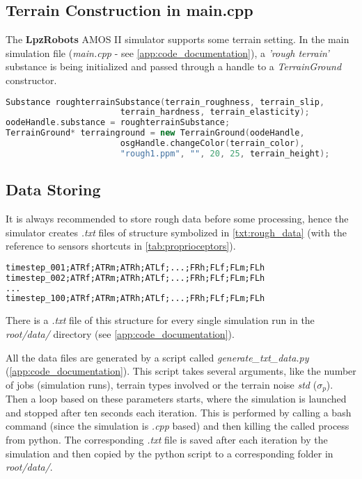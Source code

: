 \subsection*{Terrain Construction in main.cpp} \label{ssec:app:terrain_construction_in_main.cpp}
The \textbf{LpzRobots} AMOS II simulator supports some terrain setting. In the main simulation file (\textit{main.cpp} - see \ref{app:code_documentation}), a \textit{'rough terrain'} substance is being initialized and passed through a handle to a \textit{TerrainGround} constructor.

\begin{lstlisting}[language=C++, caption={Setting a terrain ground in main.cpp}, label=code:terrain_ground]
Substance roughterrainSubstance(terrain_roughness, terrain_slip,
                       terrain_hardness, terrain_elasticity);
oodeHandle.substance = roughterrainSubstance;
TerrainGround* terrainground = new TerrainGround(oodeHandle, 
                       osgHandle.changeColor(terrain_color),
                       "rough1.ppm", "", 20, 25, terrain_height);
\end{lstlisting}

\subsection*{Data Storing} \label{ssec:app:data_storing}
It is always recommended to store rough data before some processing, hence the simulator creates \textit{.txt} files of structure symbolized in \cref{txt:rough_data} (with the reference to sensors shortcuts in \cref{tab:proprioceptors}). 

\begin{lstlisting}[language=XML, caption={Rough sensory data files structure}, label=txt:rough_data]
timestep_001;ATRf;ATRm;ATRh;ATLf;...;FRh;FLf;FLm;FLh
timestep_002;ATRf;ATRm;ATRh;ATLf;...;FRh;FLf;FLm;FLh
...
timestep_100;ATRf;ATRm;ATRh;ATLf;...;FRh;FLf;FLm;FLh
\end{lstlisting}

There is a \textit{.txt} file of this structure for every single simulation run in the \textit{root/data/} directory (see \cref{app:code_documentation}).

All the data files are generated by a script called \textit{generate\_txt\_data.py} (\ref{app:code_documentation}). This script takes several arguments, like the number of jobs (simulation runs), terrain types involved or the terrain noise \textit{std} ($ \sigma_p $). Then a loop based on these parameters starts, where the simulation is launched and stopped after ten seconds each iteration. This is performed by calling a bash command (since the simulation is \textit{.cpp} based) and then killing the called process from python. The corresponding \textit{.txt} file is saved after each iteration by the simulation and then copied by the python script to a corresponding folder in \textit{root/data/}.

